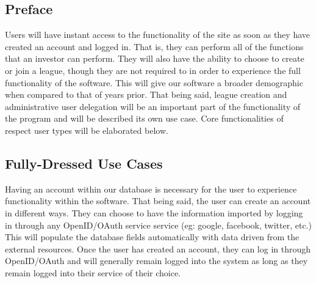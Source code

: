 \label{useCases}

\subsection{Preface}

Users will have instant access to the functionality of the site as soon as they
have created an account and logged in. That is, they can perform all of the functions
that an investor can perform. They will also have the ability to choose to create or
join a league, though they are not required to in order to experience the full
functionality of the software. This will give our software a broader demographic
when compared to that of years prior. That being said, league creation and
administrative user delegation will be an important part of the functionality of
the program and will be described its own use case. Core functionalities of respect
user types will be elaborated below.\\

\subsection{Fully-Dressed Use Cases}

Having an account within our database is necessary for the user to experience
functionality within the software. That being said, the user can create an account in
different ways. They can choose to have the information imported by logging in through
any OpenID/OAuth service service (eg: google, facebook, twitter, etc.) This will populate
the database fields automatically with data driven from the external resources.
Once the user has created an account, they can log in through OpenID/OAuth and will
generally remain logged into the system as long as they remain logged into their service
of their choice.\\

